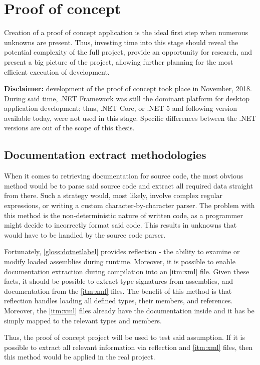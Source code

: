 \chapter{Proof of concept}

Creation of a proof of concept application is the ideal first step when numerous unknowns are present. Thus, investing time into this stage should reveal the potential complexity of the full project, provide an opportunity for research, and present a big picture of the project, allowing further planning for the most efficient execution of development.

\textbf{Disclaimer:}
development of the proof of concept took place in November, 2018. During said time, .NET Framework was still the dominant platform for desktop application development; thus, .NET Core, or .NET 5 and following version available today, were not used in this stage. Specific differences between the .NET versions are out of the scope of this thesis.

\section{Documentation extract methodologies}
When it comes to retrieving documentation for source code, the most obvious method would be to parse said source code and extract all required data straight from there. Such a strategy would, most likely, involve complex regular expressions, or writing a custom character-by-character parser. The problem with this method is the non-deterministic nature of written code, as a programmer might decide to incorrectly format said code. This results in unknowns that would have to be handled by the source code parser.

Fortunately, \ref{gloss:dotnetlabel} provides reflection - the ability to examine or modify loaded assemblies during runtime. Moreover, it is possible to enable documentation extraction during compilation into an \ref{itm:xml} file. Given these facts, it should be possible to extract type signatures from assemblies, and documentation from the \ref{itm:xml} files. The benefit of this method is that reflection handles loading all defined types, their members, and references. Moreover, the \ref{itm:xml} files already have the documentation inside and it has be simply mapped to the relevant types and members.

Thus, the proof of concept project will be used to test said assumption. If it is possible to extract all relevant information via reflection and \ref{itm:xml} files, then this method would be applied in the real project.

